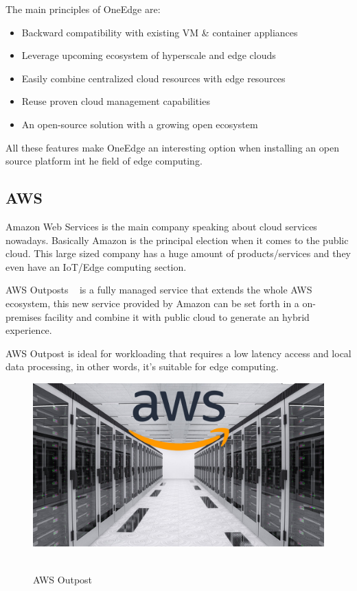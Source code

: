 The main principles of OneEdge are:
\begin{itemize}
    \item Backward compatibility with existing VM \& container appliances
    \item Leverage upcoming ecosystem of hyperscale and edge clouds
    \item Easily combine centralized cloud resources with edge resources
    \item Reuse proven cloud management capabilities
    \item An open-source solution with a growing open ecosystem
\end{itemize}

All these features make OneEdge an interesting option when installing an open source platform int he field of edge computing.

\newpage
\subsection{AWS}
\label{makereference2.3.3}


Amazon Web Services is the main company speaking about cloud services nowadays. Basically Amazon is the principal election when it comes to the public cloud.
This large sized company has a huge amount of products/services and they even have an IoT/Edge computing section.

AWS Outposts ~\cite{aws_outpost} is a fully managed service that extends the whole AWS ecosystem, this new service provided by Amazon can be set forth in a on-premises facility and combine it with public cloud to generate an hybrid experience.

AWS Outpost is ideal for workloading that requires a low latency access and local data processing, in other words, it's suitable for edge computing.

\begin{figure}[h]%
    \includegraphics[width=6.5in]{figures/aws_outpost.jpg}
~\caption{AWS Outpost}
\label{figure2.3}
\end{figure}